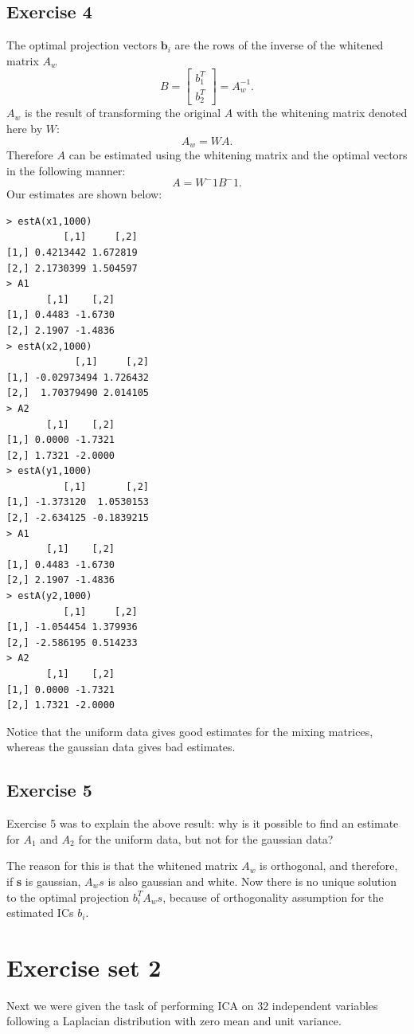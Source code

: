 \documentclass{article}
\begin{document}
\subsection{Exercise 4}
The optimal projection vectors $\textbf{b}_i$ are the rows of the inverse of the
whitened matrix $A_w$
\[
B = \left[ \begin{array}{ccc}
b_1^T  \\
b_2 ^T \end{array} \right] = A_w^{-1}.
\]
$A_w$ is the result of transforming the original $A$ with the
whitening matrix denoted here by $W$:
\[
A_w = WA.
\]
Therefore $A$ can be estimated using the whitening matrix and the optimal
vectors in the following manner:
\[
A = W^-1B^-1.
\]
Our estimates are shown below:
\begin{verbatim}
> estA(x1,1000)
          [,1]     [,2]
[1,] 0.4213442 1.672819
[2,] 2.1730399 1.504597
> A1
       [,1]    [,2]
[1,] 0.4483 -1.6730
[2,] 2.1907 -1.4836
> estA(x2,1000)
            [,1]     [,2]
[1,] -0.02973494 1.726432
[2,]  1.70379490 2.014105
> A2
       [,1]    [,2]
[1,] 0.0000 -1.7321
[2,] 1.7321 -2.0000
> estA(y1,1000)
          [,1]       [,2]
[1,] -1.373120  1.0530153
[2,] -2.634125 -0.1839215
> A1
       [,1]    [,2]
[1,] 0.4483 -1.6730
[2,] 2.1907 -1.4836
> estA(y2,1000)
          [,1]     [,2]
[1,] -1.054454 1.379936
[2,] -2.586195 0.514233
> A2
       [,1]    [,2]
[1,] 0.0000 -1.7321
[2,] 1.7321 -2.0000
\end{verbatim}
Notice that the uniform data gives good estimates for the mixing
matrices, whereas the gaussian data gives bad estimates.
\subsection{Exercise 5}
Exercise 5 was to explain the above result: why is it possible to find
an estimate for $A_1$ and $A_2$ for the uniform data, but not for the
gaussian data?

The reason for this is that the whitened matrix $A_w$ is orthogonal,
and therefore, if \textbf{s} is gaussian, $A_ws$ is also gaussian and
white. Now there is no unique solution to the optimal projection
$b_i^TA_ws$, because of orthogonality assumption for the estimated ICs
$b_i$.




\section{Exercise set 2}
Next we were given the task of performing ICA on 32 independent
variables following a Laplacian distribution with zero mean and unit variance.
\end{document}
